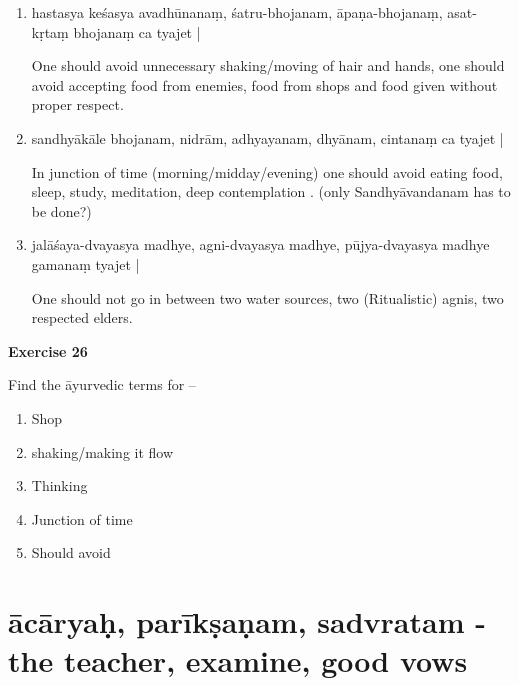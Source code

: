 \begin{enumerate}
\item {}

hastasya keśasya avadhūnanaṃ, śatru-bhojanam, āpaṇa-bhojanaṃ, asat-kṛtaṃ bhojanaṃ ca  tyajet | 

One should avoid unnecessary shaking/moving of hair and hands, one should avoid accepting food from enemies, food from shops and food given without proper respect. 

\item {}

sandhyākāle bhojanam, nidrām, adhyayanam, dhyānam, cintanaṃ ca tyajet | 

In junction of time (morning/midday/evening) one should avoid eating food, sleep, study, meditation, deep contemplation . (only Sandhyāvandanam has to be done?) 

\item {}

jalāśaya-dvayasya madhye, agni-dvayasya madhye, pūjya-dvayasya madhye gamanaṃ tyajet |  

One should not go in between two water sources, two (Ritualistic) agnis, two respected elders.
\end{enumerate}

\begin{center}
\textbf{\large Exercise 26}
\end{center}

Find the āyurvedic terms for –
\begin{enumerate}
\renewcommand{\theenumi}{\alph{enumi}}
\renewcommand{\labelenumi}{\theenumi.}
\item Shop
\item shaking/making it flow
\item Thinking
\item Junction of time  
\item Should avoid 
\end{enumerate}

\chapter{ācāryaḥ, parīkṣaṇam, sadvratam - the teacher, examine, good vows}

